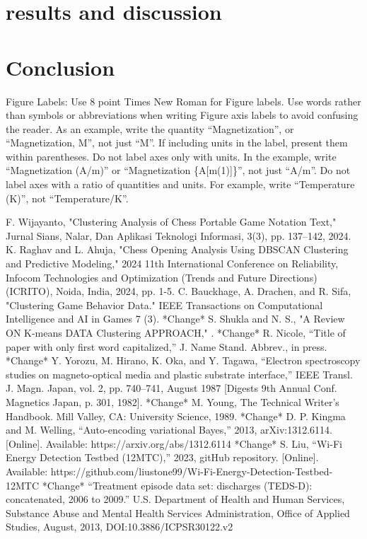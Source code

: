 \documentclass[conference]{IEEEtran}
\begin{document}
\section{results and discussion}

\section{Conclusion}

Figure Labels: Use 8 point Times New Roman for Figure labels. Use words 
rather than symbols or abbreviations when writing Figure axis labels to 
avoid confusing the reader. As an example, write the quantity 
``Magnetization'', or ``Magnetization, M'', not just ``M''. If including 
units in the label, present them within parentheses. Do not label axes only 
with units. In the example, write ``Magnetization (A/m)'' or ``Magnetization 
\{A[m(1)]\}'', not just ``A/m''. Do not label axes with a ratio of 
quantities and units. For example, write ``Temperature (K)'', not 
``Temperature/K''.

\begin{thebibliography}{00}
 F. Wijayanto, "Clustering Analysis of Chess Portable Game Notation Text," Jurnal Sians, Nalar, Dan Aplikasi Teknologi Informasi, 3(3), pp. 137--142, 2024.
 K. Raghav and L. Ahuja, "Chess Opening Analysis Using DBSCAN Clustering and Predictive Modeling," 2024 11th International Conference on Reliability, Infocom Technologies and Optimization (Trends and Future Directions) (ICRITO), Noida, India, 2024, pp. 1-5.
 C. Bauckhage, A. Drachen, and R. Sifa, "Clustering Game Behavior Data." IEEE Transactions on Computational Intelligence and AI in Games 7 (3).
 *Change* S. Shukla and N. S., "A Review ON K-means DATA Clustering APPROACH," .
 *Change* R. Nicole, ``Title of paper with only first word capitalized,'' J. Name Stand. Abbrev., in press.
 *Change* Y. Yorozu, M. Hirano, K. Oka, and Y. Tagawa, ``Electron spectroscopy studies on magneto-optical media and plastic substrate interface,'' IEEE Transl. J. Magn. Japan, vol. 2, pp. 740--741, August 1987 [Digests 9th Annual Conf. Magnetics Japan, p. 301, 1982].
 *Change* M. Young, The Technical Writer's Handbook. Mill Valley, CA: University Science, 1989.
 *Change* D. P. Kingma and M. Welling, ``Auto-encoding variational Bayes,'' 2013, arXiv:1312.6114. [Online]. Available: https://arxiv.org/abs/1312.6114
 *Change* S. Liu, ``Wi-Fi Energy Detection Testbed (12MTC),'' 2023, gitHub repository. [Online]. Available: https://github.com/liustone99/Wi-Fi-Energy-Detection-Testbed-12MTC
 *Change* ``Treatment episode data set: discharges (TEDS-D): concatenated, 2006 to 2009.'' U.S. Department of Health and Human Services, Substance Abuse and Mental Health Services Administration, Office of Applied Studies, August, 2013, DOI:10.3886/ICPSR30122.v2
\end{thebibliography}
\end{document}
